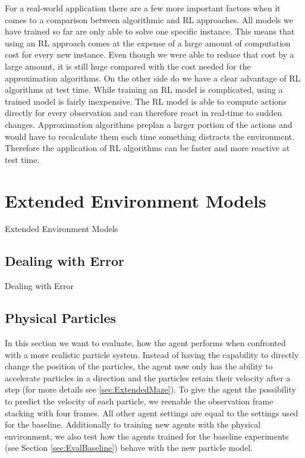For a real-world application there are a few more important factors when it comes to a comparison between algorithmic and RL approaches. All models we have trained so far are only able to solve one specific instance. This means that using an RL approach comes at the expense of a large amount of computation cost for every new instance. Even though we were able to reduce that cost by a large amount, it is still huge compared with the cost needed for the approximation algorithms. On the other side do we have a clear advantage of RL algorithms at test time. While training an RL model is complicated, using a trained model is fairly inexpensive. The RL model is able to compute actions directly for every observation and can therefore react in real-time to sudden changes. Approximation algorithms preplan a larger portion of the actions and would have to recalculate them each time something distracts the environment. Therefore the application of RL algorithms can be faster and more reactive at test time.

\section{Extended Environment Models} \label{sec:EvalExtendedModels}
Extended Environment Models
\subsection{Dealing with Error} \label{sec:EvalError}
Dealing with Error

\subsection{Physical Particles} \label{sec:EvalPhysical}
In this section we want to evaluate, how the agent performs when confronted with a more realistic particle system. Instead of having the capability to directly change the position of the particles, the agent now only has the ability to accelerate particles in a direction and the particles retain their velocity after a step (for more details see \ref{sec:ExtendedMaze}). To give the agent the possibility to predict the velocity of each particle, we reenable the observation frame stacking with four frames. All other agent settings are equal to the settings used for the baseline. Additionally to training new agents with the physical environment, we also test how the agents trained for the baseline experiments (see Section \ref{sec:EvalBaseline}) behave with the new particle model.

